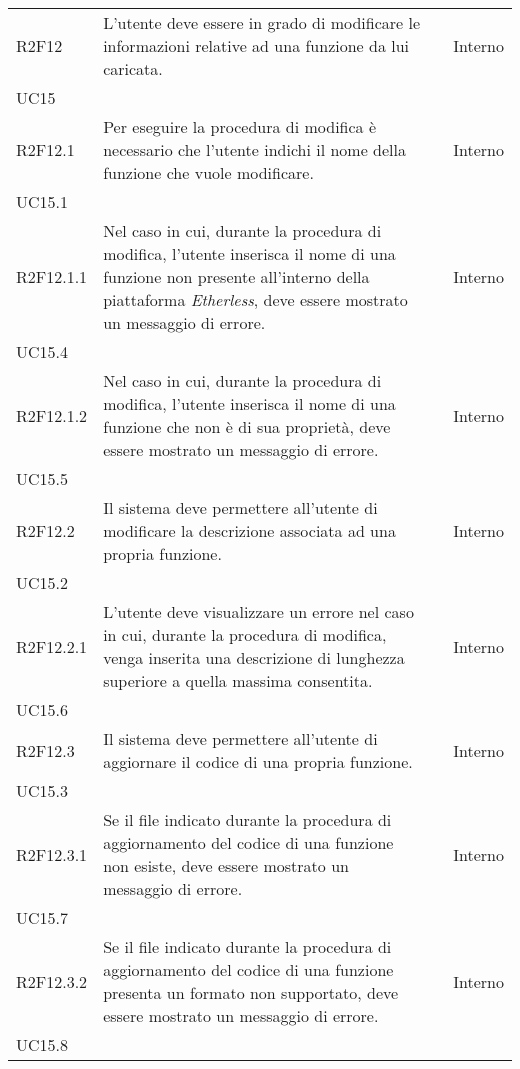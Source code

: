 \begin{longtable}{ 
		>{\centering}p{} 
		>{}p{} 
		>{\centering}p{}
		>{\centering}p{} }
	R2F12 & L'utente deve essere in grado di modificare le informazioni relative 
		ad una funzione da lui caricata. 											& \ob & Interno \\ UC15 \tabularnewline
	R2F12.1 & Per eseguire la procedura di modifica è necessario che l'utente 
		indichi il nome della funzione che vuole modificare. 						& \ob & Interno \\ UC15.1 \tabularnewline
	R2F12.1.1 & Nel caso in cui, durante la procedura di modifica, l'utente 
		inserisca il nome di una funzione non presente all'interno della piattaforma
		\textit{Etherless}, deve essere mostrato un messaggio di errore.				& \ob & Interno \\ UC15.4 \tabularnewline
	R2F12.1.2 & Nel caso in cui, durante la procedura di modifica, l'utente 
		inserisca il nome di una funzione che non è di sua proprietà, deve essere 
		mostrato un messaggio di errore.												& \ob & Interno \\ UC15.5 \tabularnewline
	R2F12.2 & Il sistema deve permettere all'utente di modificare la descrizione 
		associata ad una propria funzione. 											& \ob & Interno \\ UC15.2 \tabularnewline
	R2F12.2.1 & L'utente deve visualizzare un errore nel caso in cui, durante 
		la procedura di modifica, venga inserita una descrizione di lunghezza
		superiore a quella massima consentita. 										& \ob & Interno \\ UC15.6 \tabularnewline
	R2F12.3 & Il sistema deve permettere all'utente di aggiornare il codice di 
		una propria funzione. 														& \ob & Interno \\ UC15.3 \tabularnewline	
	R2F12.3.1 & Se il file indicato durante la procedura di aggiornamento del 
		codice di una funzione non esiste, deve essere mostrato un messaggio di 
		errore.																		& \ob & Interno \\ UC15.7 \tabularnewline
	R2F12.3.2 & Se il file indicato durante la procedura di aggiornamento del 
		codice di una funzione presenta un formato non supportato, deve 
		essere mostrato un messaggio di errore.										& \ob & Interno \\ UC15.8 \tabularnewline  
		

\end{longtable}
